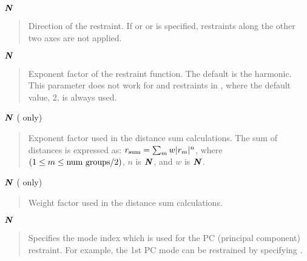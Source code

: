 \documentclass[a4paper,11pt,oneside,english]{sphinxmanual}
\begin{document}
\(\textbf{\textit{N}}\) 
\begin{quote}


Direction of the  restraint. If  or  or  is specified, restraints
along the other two axes are not applied.
\end{quote}

\(\textbf{\textit{N}}\) 
\begin{quote}


Exponent factor of the restraint function. The default is the harmonic.
This parameter does not work for  and  restraints
in , where the default value, 2, is always used.
\end{quote}

\(\textbf{\textit{N}}\)  ( only)
\begin{quote}


Exponent factor used in the distance sum calculations.
The sum of distances is expressed as:
\(r_{\rm sum} = \sum_m{w|r_m|^n}\), where
\((1 \leq m \leq {\rm {num\ groups/2}})\),
\(n\) is \(\textbf{\textit{N}}\),
and \(w\) is \(\textbf{\textit{N}}\).
\end{quote}

\(\textbf{\textit{N}}\)  ( only)
\begin{quote}


Weight factor used in the distance sum calculations.
\end{quote}

\(\textbf{\textit{N}}\) 
\begin{quote}

Specifies the mode index which is used for the PC (principal component)
restraint. For example, the 1st PC mode can be restrained by specifying
.
\end{quote}
\end{document}
